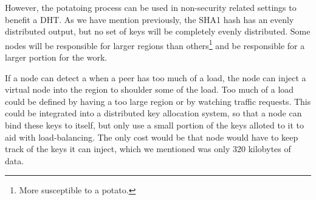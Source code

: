 \documentclass[a4paper]{article}
\begin{document}
However, the potatoing process can be used in non-security related settings to benefit a DHT.
As we have mention previously, the SHA1 hash has an evenly distributed output, but no set of keys will be completely evenly distributed.
Some nodes will be responsible for larger regions than others\footnote{More susceptible to a potato.} and be responsible for a larger portion for the work.

If a node can detect a when a peer has too much of a load, the node can inject a virtual node into the region to shoulder some of the load.
Too much of a load could be defined by having a too large region or by watching traffic requests.
This could be integrated into a distributed key allocation system, so that a node can bind these keys to itself, but only use a small portion of the keys alloted to it to aid with load-balancing.
The only cost would be that node would have to keep track of the keys it can inject, which we mentioned was only 320 kilobytes of data.




\end{document}
